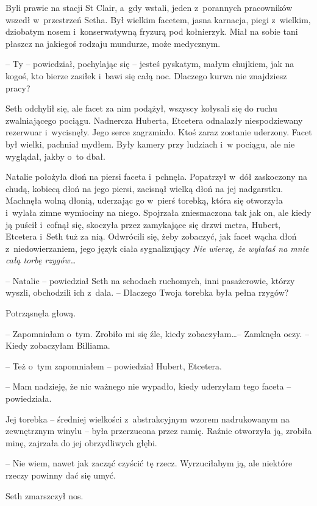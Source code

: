 \documentclass[oneside,polish,11pt,sfheadings]{mwbk}
\begin{document}
Byli prawie na stacji St Clair, a~gdy wstali, jeden z~porannych
pracowników wszedł w~przestrzeń Setha. Był wielkim facetem, jasna
karnacja, piegi z~wielkim, dziobatym nosem i~konserwatywną fryzurą pod
kołnierzyk. Miał na sobie tani płaszcz na jakiegoś rodzaju mundurze,
może medycznym. 

-- Ty -- powiedział, pochylając się -- jesteś pyskatym,
małym chujkiem, jak na kogoś, kto bierze zasiłek i~bawi się całą noc.
Dlaczego kurwa nie znajdziesz pracy?

Seth odchylił się, ale facet za nim podążył, wszyscy kołysali się do
ruchu zwalniającego pociągu. Nadnercza Huberta, Etcetera odnalazły
niespodziewany rezerwuar i~wycisnęły. Jego serce zagrzmiało. Ktoś zaraz
zostanie uderzony. Facet był wielki, pachniał mydłem. Były kamery przy
ludziach i~w pociągu, ale nie wyglądał, jakby o~to dbał.

Natalie położyła dłoń na piersi faceta i~pchnęła. Popatrzył w~dół
zaskoczony na chudą, kobiecą dłoń na jego piersi, zacisnął wielką dłoń
na jej nadgarstku. Machnęła wolną dłonią, uderzając go w~pierś torebką,
która się otworzyła i~wylała zimne wymiociny na niego. Spojrzała
zniesmaczona tak jak on, ale kiedy ją puścił i~cofnął się, skoczyła
przez zamykające się drzwi metra, Hubert, Etcetera i~Seth tuż za nią.
Odwrócili się, żeby zobaczyć, jak facet wącha dłoń z~niedowierzaniem,
jego język ciała sygnalizujący \textit{Nie wierzę, że wylałaś na mnie całą torbę
rzygów\ldots }

-- Natalie -- powiedział Seth na schodach ruchomych, inni pasażerowie,
którzy wyszli, obchodzili ich z~dala. -- Dlaczego Twoja torebka była
pełna rzygów?

Potrząsnęła głową. 

-- Zapomniałam o~tym. Zrobiło mi się źle, kiedy
zobaczyłam\ldots  -- Zamknęła oczy. -- Kiedy zobaczyłam Billiama.

-- Też o~tym zapomniałem -- powiedział Hubert, Etcetera.

-- Mam nadzieję, że nic ważnego nie wypadło, kiedy uderzyłam tego faceta
-- powiedziała. 

Jej torebka -- średniej wielkości z~abstrakcyjnym wzorem
nadrukowanym na zewnętrznym winylu -- była przerzucona przez ramię.
Raźnie otworzyła ją, zrobiła minę, zajrzała do jej obrzydliwych głębi. 

-- Nie wiem, nawet jak zacząć czyścić tę rzecz. Wyrzuciłabym ją, ale
niektóre rzeczy powinny dać się umyć.

Seth zmarszczył nos. 
\end{document}
